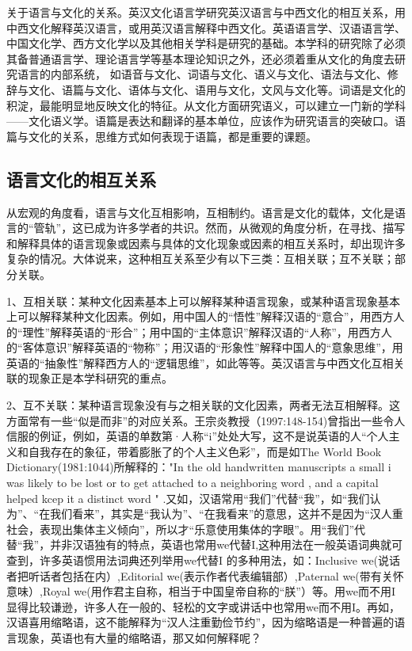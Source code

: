 关于语言与文化的关系。英汉文化语言学研究英汉语言与中西文化的相互关系，用中西文化解释英汉语言，或用英汉语言解释中西文化。英语语言学、汉语语言学、中国文化学、西方文化学以及其他相关学科是研究的基础。本学科的研究除了必须其备普通语言学、理论语言学等基本理论知识之外，还必须着重从文化的角度去研究语言的内部系统，
如语音与文化、词语与文化、语义与文化、语法与文化、修辞与文化、语篇与文化、语体与文化、语用与文化，文风与文化等。词语是文化的积淀，最能明显地反映文化的特征。从文化方面研究语义，可以建立一门新的学科——文化语义学。语篇是表达和翻译的基本单位，应该作为研究语言的突破口。语篇与文化的关系，思维方式如何表现于语篇，都是重要的课题。

\subsection{语言文化的相互关系}

从宏观的角度看，语言与文化互相影响，互相制约。语言是文化的载体，文化是语言的“管轨”，这已成为许多学者的共识。然而，从微观的角度分析，在寻找、描写和解释具体的语言现象或因素与具体的文化现象或因素的相互关系时，却出现许多复杂的情况。大体说来，这种相互关系至少有以下三类：互相关联；互不关联；部分关联。

1、互相关联：某种文化因素基本上可以解释某种语言现象，或某种语言现象基本上可以解释某种文化因素。例如，用中国人的“悟性”解释汉语的“意合”，用西方人的“理性”解释英语的“形合”；用中国的“主体意识”解释汉语的“人称”，用西方人的“客体意识”解释英语的“物称”；用汉语的“形象性”解释中国人的“意象思维”，用英语的“抽象性”解释西方人的“逻辑思维”，如此等等。英汉语言与中西文化互相关联的现象正是本学科研究的重点。

2、互不关联：某种语言现象没有与之相关联的文化因素，两者无法互相解释。这方面常有一些“似是而非”的对应关系。王宗炎教授（1997:148-154)曾指出一些令人信服的例证，例如，英语的单数第·人称“i”处处大写，这不是说英语的人“个人主义和自我存在的象征，带着膨胀了的个人主义色彩”，而是如The World Book Dictionary(1981:1044)所解释的："In the old handwritten manuscripts a small i was likely to be lost or to get attached to a neighboring word , and a capital helped kcep it a distinct word " .又如，汉语常用“我们”代替“我”，如“我们认为”、“在我们看来”，其实是“我认为”、“在我看来”的意思，这并不是因为“汉人重社会，表现出集体主义倾向”，所以才“乐意使用集体的字眼”。用“我们”代替“我”，并非汉语独有的特点，英语也常用we代替I,这种用法在一般英语词典就可查到，许多英语惯用法词典还列举用we代替I 的多种用法，如：Inclusive we(说话者把听话者包括在内）,Editorial we(表示作者代表编辑部）,Paternal we(带有关怀意味）,Royal we(用作君主自称，相当于中国皇帝自称的“朕”）等。用we而不用I显得比较谦逊，许多人在一般的、轻松的文字或讲话中也常用we而不用I。再如，汉语喜用缩略语，这不能解释为“汉人注重勤俭节约”，因为缩略语是一种普遍的语言现象，英语也有大量的缩略语，那又如何解释呢？

